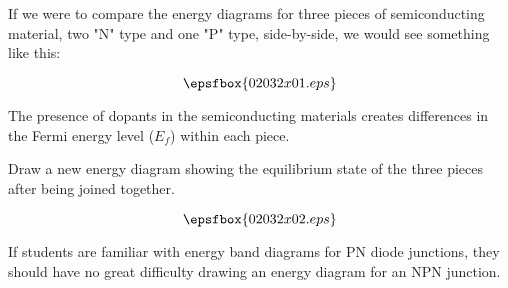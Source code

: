 

If we were to compare the energy diagrams for three pieces of semiconducting material, two "N" type and one "P" type, side-by-side, we would see something like this:

$$\epsfbox{02032x01.eps}$$

The presence of dopants in the semiconducting materials creates differences in the Fermi energy level ($E_f$) within each piece.

Draw a new energy diagram showing the equilibrium state of the three pieces after being joined together.







$$\epsfbox{02032x02.eps}$$







If students are familiar with energy band diagrams for PN diode junctions, they should have no great difficulty drawing an energy diagram for an NPN junction.




